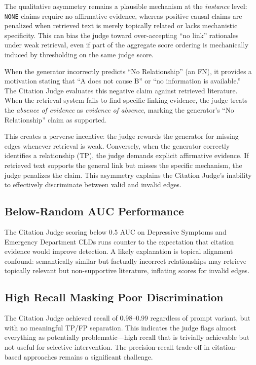 The qualitative asymmetry remains a plausible mechanism at the \textit{instance} level: \texttt{NONE} claims require no affirmative evidence, whereas positive causal claims are penalized when retrieved text is merely topically related or lacks mechanistic specificity. This can bias the judge toward over-accepting ``no link'' rationales under weak retrieval, even if part of the aggregate score ordering is mechanically induced by thresholding on the same judge score.

When the generator incorrectly predicts ``No Relationship'' (an FN), it provides a motivation stating that ``A does not cause B'' or ``no information is available.'' The Citation Judge evaluates this negative claim against retrieved literature. When the retrieval system fails to find specific linking evidence, the judge treats the \textit{absence of evidence} as \textit{evidence of absence}, marking the generator's ``No Relationship'' claim as supported.

This creates a perverse incentive: the judge rewards the generator for missing edges whenever retrieval is weak. Conversely, when the generator correctly identifies a relationship (TP), the judge demands explicit affirmative evidence. If retrieved text supports the general link but misses the specific mechanism, the judge penalizes the claim. This asymmetry explains the Citation Judge's inability to effectively discriminate between valid and invalid edges.

\subsection{Below-Random AUC Performance}

The Citation Judge scoring below 0.5 AUC on Depressive Symptoms and Emergency Department CLDs runs counter to the expectation that citation evidence would improve detection. A likely explanation is topical alignment confound: semantically similar but factually incorrect relationships may retrieve topically relevant but non-supportive literature, inflating scores for invalid edges.

\subsection{High Recall Masking Poor Discrimination}

The Citation Judge achieved recall of 0.98--0.99 regardless of prompt variant, but with no meaningful TP/FP separation. This indicates the judge flags almost everything as potentially problematic---high recall that is trivially achievable but not useful for selective intervention. The precision-recall trade-off in citation-based approaches remains a significant challenge.

